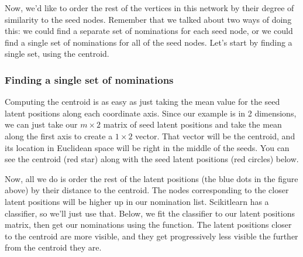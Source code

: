 \documentclass[letterpaper,10pt,english]{jupyterBook}
\begin{document}
\noindent{}

\sphinxAtStartPar
Now, we’d like to order the rest of the vertices in this network by their degree of similarity to the seed nodes. Remember that we talked about two ways of doing this: we could find a separate set of nominations for each seed node, or we could find a single set of nominations for all of the seed nodes. Let’s start by finding a single set, using the centroid.


\subsubsection{Finding a single set of nominations}
\label{\detokenize{applications/ch8/single-vertex-nomination:finding-a-single-set-of-nominations}}
\sphinxAtStartPar
Computing the centroid is as easy as just taking the mean value for the seed latent positions along each coordinate axis. Since our example is in 2 dimensions, we can just take our \(m \times 2\) matrix of seed latent positions and take the mean along the first axis to create a \(1 \times 2\) vector. That vector will be the centroid, and its location in Euclidean space will be right in the middle of the seeds. You can see the centroid (red star) along with the seed latent positions (red circles) below.

\begin{sphinxVerbatim}[commandchars=\\\{\}]
  
\end{sphinxVerbatim}

\noindent{}

\sphinxAtStartPar
Now, all we do is order the rest of the latent positions (the blue dots in the figure above) by their distance to the centroid. The nodes corresponding to the closer latent positions will be higher up in our nomination list. Scikit\sphinxhyphen{}learn has a  classifier, so we’ll just use that. Below, we fit the classifier to our latent positions matrix, then get our nominations using the  function. The latent positions closer to the centroid are more visible, and they get progressively less visible the further from the centroid they are.
\end{document}
